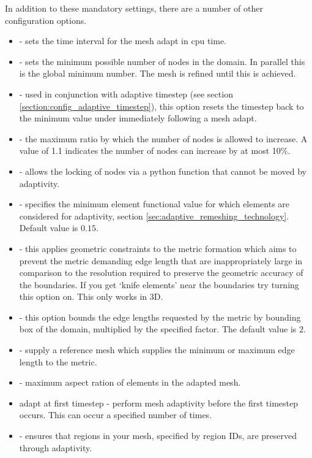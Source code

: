 In addition to these mandatory settings, there are a number of other configuration options.
\begin{itemize}
\item {} - sets the time interval for the mesh adapt in cpu time.
\item {} - sets the minimum possible number of nodes in the domain. In parallel this is the
global minimum number. The mesh is refined until this is achieved.
\item {} - used in conjunction with adaptive timestep (see section \ref{section:config_adaptive_timestep}), this
option resets the timestep back to the minimum value under  immediately following
a mesh adapt.
\item {} - the maximum ratio by which the number of nodes is allowed to increase. A value of 1.1
indicates the number of nodes can increase by at most 10\%.
\item {} - allows the locking of nodes via a python function that cannot be moved by adaptivity.
\item {} - specifies the minimum element functional value for which elements are considered for adaptivity, section \ref{sec:adaptive_remeshing_technology}. Default value is $0.15$.
\item {} - this applies geometric constraints to the metric formation which aims to prevent the metric demanding edge length that are inappropriately large in comparison to the resolution required to preserve the geometric accuracy of the boundaries. If you get `knife elements' near the boundaries try turning this option on. This only works in 3D. 
\item {} - this option bounds the edge lengths requested by the metric by bounding box of the domain, multiplied by the specified factor. The default value is $2$.
\item {} - supply a reference mesh which supplies the minimum or maximum edge length to the metric.
\item {} -  maximum aspect ration of elements in the adapted mesh.
\item adapt at first timestep - perform mesh adaptivity before the first timestep occurs. This can occur a specified number of times.
\item {} - ensures that regions in your mesh, specified by region IDs, are preserved through adaptivity.

\end{itemize}
